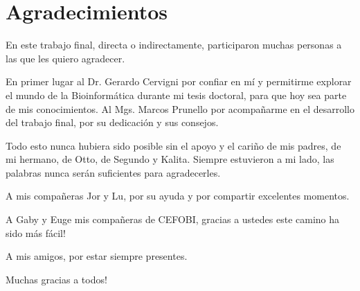 
\chapter*{Agradecimientos}


En este trabajo final, directa o indirectamente, participaron muchas personas a las que les quiero agradecer.

En primer lugar al Dr. Gerardo Cervigni por confiar en mí y permitirme explorar el mundo de la Bioinformática durante mi tesis doctoral, para que hoy sea parte de mis conocimientos. Al Mgs. Marcos Prunello por acompañarme en el desarrollo del trabajo final, por su dedicación y sus consejos.

Todo esto nunca hubiera sido posible sin el apoyo y el cariño de mis padres, de mi hermano, de Otto, de Segundo y Kalita. Siempre estuvieron a mi lado, las palabras nunca serán suficientes para agradecerles.

A mis compañeras Jor y Lu, por su ayuda y por compartir excelentes momentos.

A Gaby y Euge mis compañeras de CEFOBI, gracias a ustedes este camino ha sido más fácil!

A mis amigos, por estar siempre presentes.

Muchas gracias a todos! 





